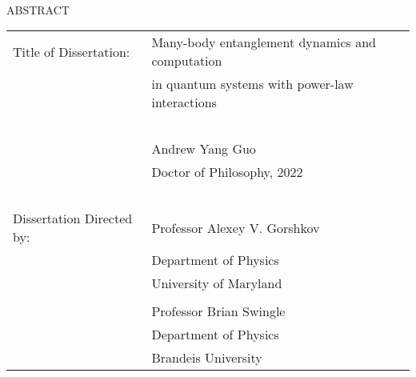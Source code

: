 \hbox{\ }

\begin{center}
\large{{ABSTRACT}}

\vspace{3em}

\end{center}
\hspace{-.15in}
\begin{tabular}{ll}
Title of Dissertation:     & {\large  Many-body entanglement dynamics and computation}\\
                           & {\large  in quantum systems with power-law interactions } \\
\                         \\
                           & {\large  Andrew Yang Guo } \\
                           & {\large Doctor of Philosophy, 2022} \\
\                         \\
Dissertation Directed by:  & {\large  Professor Alexey V. Gorshkov} \\
                           & {\large  Department of Physics } \\
                           & {\large University of Maryland}
                           \\\\
                           & {\large Professor Brian Swingle} \\
                           & {\large Department of Physics} \\
                           & {\large Brandeis University}
\end{tabular}

\vspace{3em}

\begin{doublespacing}
\par
\end{doublespacing}
